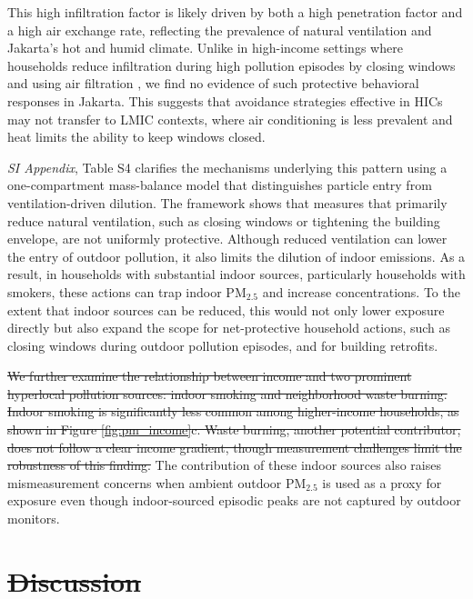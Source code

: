 \documentclass[reqno,12pt,notitlepage]{article}
\providecommand{\DIFadd}[1]{{\protect\color{BLUE}#1}} %
\providecommand{\DIFdel}[1]{{\protect\color{red}\sout{#1}}} %
\providecommand{\DIFaddbegin}{} %
\providecommand{\DIFaddend}{} %
\providecommand{\DIFdelbegin}{} %
\providecommand{\DIFdelend}{} %
\begin{document}
\DIFadd{This high infiltration factor is likely driven by both a high penetration factor and a high air exchange rate, reflecting the prevalence of natural ventilation and Jakarta's hot and humid climate. Unlike in high-income settings where households reduce infiltration during high pollution episodes by closing windows and using air filtration \citep{burke_exposures_2022}, we find no evidence of such protective behavioral responses in Jakarta. This suggests that avoidance strategies effective in HICs may not transfer to LMIC contexts, where air conditioning is less prevalent and heat limits the ability to keep windows closed.
}

\DIFadd{\textit{SI Appendix}, Table S4 clarifies the mechanisms underlying this pattern using a one-compartment mass-balance model that distinguishes particle entry from ventilation-driven dilution. The framework shows that measures that primarily reduce natural ventilation, such as closing windows or tightening the building envelope, are not uniformly protective. Although reduced ventilation can lower the entry of outdoor pollution, it also limits the dilution of indoor emissions. As a result, in households with substantial indoor sources, particularly households with smokers, these actions can trap indoor PM$_{2.5}$ and increase concentrations. To the extent that indoor sources can be reduced, this would not only lower exposure directly but also expand the scope for net-protective household actions, such as closing windows during outdoor pollution episodes, and for building retrofits. 
}\DIFaddend 

\DIFdelbegin \DIFdel{We further examine the relationship between income and two prominent hyperlocal pollution sources: indoor smoking and neighborhood waste burning. Indoor smoking is significantly less common among higher-income households, as shown in Figure \ref{fig:pm_income}c. Waste burning, another potential contributor, does not follow a clear income gradient, though measurement challenges limit the robustness of this finding. 
}\DIFdelend \DIFaddbegin \DIFadd{The contribution of these indoor sources also raises mismeasurement concerns when ambient outdoor PM$_{2.5}$ is used as a proxy for exposure even though indoor-sourced episodic peaks are not captured by outdoor monitors.
}\DIFaddend 

\DIFdelbegin \section{\DIFdel{Discussion}}
\end{document}
